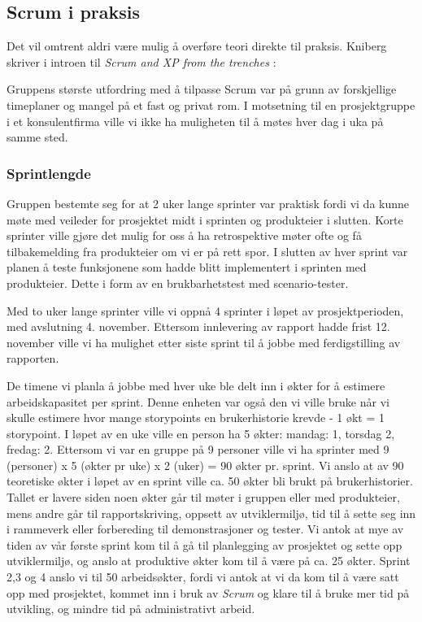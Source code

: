 \documentclass[12pt,a4paper,norsk]{article}
\begin{document}
  \subsection{Scrum i praksis}
    Det vil omtrent aldri være mulig å overføre teori direkte til praksis. Kniberg skriver i introen til \textit{Scrum and XP from the trenches} \cite[side 2]{kniberg}:

    \bigskip\begin{adjustwidth}{2.5em}{0pt}
    \end{adjustwidth}
    \bigskip Gruppens største utfordring med å tilpasse Scrum var på grunn av forskjellige timeplaner og mangel på et fast og privat rom. I motsetning til en prosjektgruppe i et konsulentfirma ville vi ikke ha muligheten til å møtes hver dag i uka på samme sted.

  \subsubsection{Sprintlengde}
  Gruppen bestemte seg for at 2 uker lange sprinter var praktisk fordi vi da kunne møte med veileder for prosjektet midt i sprinten og produkteier i slutten. Korte sprinter ville gjøre det mulig for oss å ha retrospektive møter ofte og få tilbakemelding fra produkteier om vi er på rett spor. I slutten av hver sprint var planen å teste funksjonene som hadde blitt implementert i sprinten med produkteier. Dette i form av en brukbarhetstest med scenario-tester.

    Med to uker lange sprinter ville vi oppnå 4 sprinter i løpet av prosjektperioden, med avslutning 4. november. Ettersom innlevering av rapport hadde frist 12. november ville vi ha mulighet etter siste sprint til å jobbe med ferdigstilling av rapporten.

    De timene vi planla å jobbe med hver uke ble delt inn i økter for å estimere arbeidskapasitet per sprint. Denne enheten var også den vi ville bruke når vi skulle estimere hvor mange storypoints en brukerhistorie krevde - 1 økt = 1 storypoint. I løpet av en uke ville en person ha 5 økter: mandag: 1, torsdag 2, fredag: 2. Ettersom vi var en gruppe på 9 personer ville vi ha sprinter med 9 (personer) x 5 (økter pr uke) x 2 (uker) = 90 økter pr. sprint. Vi anslo at av 90 teoretiske økter i løpet av en sprint ville ca. 50 økter bli brukt på brukerhistorier. Tallet er lavere siden noen økter går til møter i gruppen eller med produkteier, mens andre går til rapportskriving, oppsett av utviklermiljø, tid til å sette seg inn i rammeverk eller forbereding til demonstrasjoner og tester. Vi antok at mye av tiden av vår første sprint kom til å gå til planlegging av prosjektet og sette opp utviklermiljø, og anslo at produktive økter kom til å være på ca. 25 økter. Sprint 2,3 og 4 anslo vi til 50 arbeidsøkter, fordi vi antok at vi da kom til å være satt opp med prosjektet, kommet inn i bruk av \textit{Scrum} og klare til å bruke mer tid på utvikling, og mindre tid på administrativt arbeid.
\end{document}
